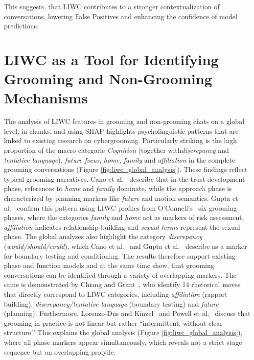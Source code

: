 This suggests, that LIWC contributes to a stronger contextualization of conversations, lowering False Positives and enhancing the confidence of model predictions.

\section{LIWC as a Tool for Identifying Grooming and Non-Grooming Mechanisms}

The analysis of LIWC features in grooming and non-grooming chats on a global level, in chunks, and using SHAP highlights psycholinguistic patterns that are linked to existing research on cybergrooming. Particularly striking is the high proportion of the macro categorie \textit{Cognition} (together with\textit{discrepancy} and \textit{tentative language}), \textit{future focus}, \textit{home}, \textit{family} and \textit{affiliation} in the complete grooming conversations (Figure \ref{fig:liwc_global_analysis}). These findings reflect typical grooming narratives. Cano et al.~\cite{Cano2014} describe that in the trust development phase, references to \textit{home} and \textit{family} dominate, while the approach phase is characterized by planning markers like \textit{future} and motion semantics. Gupta et al.~\cite{gupta2012characterizingpedophileconversationsinternet} confirm this pattern using LIWC profiles from O’Connell’s~\cite{oconnell2003typology} six grooming phases, where the categories \textit{family} and \textit{home} act as markers of risk assessment, \textit{affiliation} indicates relationship building and \textit{sexual terms} represent the sexual phase. The global analyses also highlight the category \textit{discrepancy} (\textit{would/should/could}), which Cano et al.~\cite{Cano2014} and Gupta et al.~\cite{gupta2012characterizingpedophileconversationsinternet} describe as a marker for boundary testing and conditioning. The results therefore support existing phase and function models and at the same time show, that grooming conversations can be identified through a variety of overlapping markers. The same is demonstrated by Chiang and Grant~\cite{chiangandgrant2017online}, who identify 14 rhetorical moves that directly correspond to LIWC categories, including \textit{affiliation} (rapport building), \textit{discrepancy/tentative language} (boundary testing) and \textit{future} (planning). Furthermore, Lorenzo-Dus and Kinzel~\cite{LorenzoDus2019} and Powell et al.~\cite{powell2021online}  discuss that grooming in practice is not linear but rather “intermittent, without clear structure.” This explains the global analysis (Figure \ref{fig:liwc_global_analysis}), where all phase markers appear simultaneously, which reveals not a strict stage sequence but an overlapping profyile.

